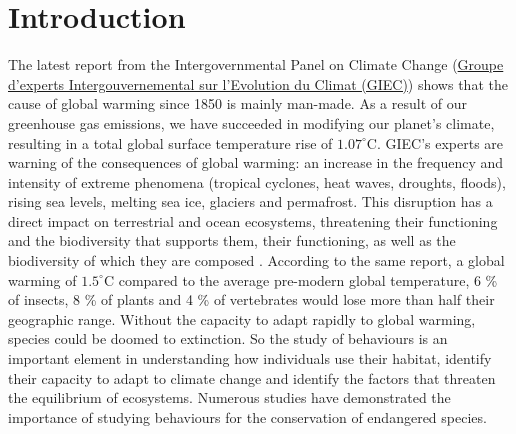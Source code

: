 \documentclass[conference]{IEEEtran}
\begin{document}
	\section{Introduction}
The latest report from the Intergovernmental Panel on Climate Change (\href{https://www.ecologie.gouv.fr/comprendre-giec}{Groupe d’experts Intergouvernemental sur l’Evolution du Climat (GIEC)}) shows that the cause of global warming since 1850 is mainly man-made. As a result of our greenhouse gas emissions, we have succeeded in modifying our planet's climate, resulting in a total global surface temperature rise of $ 1.07^\circ\text{C} $. GIEC's experts are warning of the consequences of global warming: an increase in the frequency and intensity of extreme phenomena (tropical cyclones, heat waves, droughts, floods), rising sea levels, melting sea ice, glaciers and permafrost. This disruption has a direct impact on terrestrial and ocean ecosystems, threatening their functioning and the biodiversity that supports them, their functioning, as well as the biodiversity of which they are composed \cite[p.3]{jeantet2021identification}. According to the same report, a global warming of $ 1.5 ^\circ\text{C} $ compared to the average pre-modern global temperature,
6 \% of insects, 8 \% of plants and 4 \% of vertebrates would lose more than half their geographic range. Without the capacity to adapt rapidly to global warming, species could be doomed to extinction.  So
the study of behaviours is an important element in understanding how individuals
use their habitat, identify their capacity to adapt to climate change and identify the factors that threaten the equilibrium of ecosystems. Numerous studies have demonstrated the importance of studying behaviours
for the conservation of endangered species. 
\end{document}
